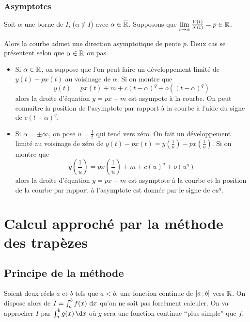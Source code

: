 \subsubsection{Asymptotes}

Soit $\alpha$ une borne de $I$, ($\alpha \notin I$) avec $\alpha \in \overline{\mathbb{R}}$. Supposons que $\lim\limits_{t \to \alpha} \frac{Y(t)}{X(t)} = p \in \mathbb{R}$.

Alors la courbe admet une direction asymptotique de pente $p$. Deux cas se présentent selon que $\alpha \in \mathbb{R}$ ou pas.
\begin{itemize}
\item Si $\alpha \in \mathbb{R}$, on suppose que l'on peut faire un développement limité de $y(t)-px(t)$ au voisinage de $\alpha$. Si on montre que
  \begin{equation}
    y(t)=px(t)+m +c(t-\alpha)^q +o((t-\alpha)^q)
  \end{equation}
  alors la droite d'équation $y=px+m$ est asympote à la courbe. On peut connaître la position de l'asymptote par rapport à la courbe à l'aide du signe de $c(t-\alpha)^q$.
\item Si $\alpha =\pm \infty$, on pose $u=\frac{1}{t}$ qui tend vers zéro. On fait un développement limité au voisinage de zéro de $y(t)-px(t) = y\left(\frac{1}{u}\right) -px \left(\frac{1}{u}\right)$. Si on montre que
  \begin{equation}
    y\left(\frac{1}{u}\right)=px\left(\frac{1}{u}\right)+m +c(u)^q +o(u^q)
  \end{equation}
  alors la droite d'équation $y=px+m$ est asymptote à la courbe et la position de la courbe par rapport à l'asymptote est donnée par le signe de $cu^q$.
\end{itemize}

\section{Calcul approché par la méthode des trapèzes}

\subsection{Principe de la méthode}

Soient deux réels $a$ et $b$ tels que $a<b$, une fonction continue de $\left[ a \, ;  b \right]$ vers $\mathbb{R}$. On dispose alors de $I=\int_a^b f(x)\,\mathop{}\mathopen{}\mathrm{d} x$ qu'on ne sait pas forcèment calculer. On va approcher $I$ par $\int_a^bg(x)\,\d x$ où $g$ sera une fonction continue ``plus simple'' que $f$.

